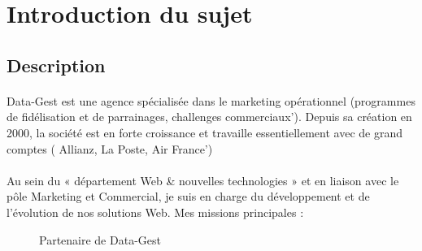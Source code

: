 \section{Introduction du sujet}
\justifying
\subsection{Description}
\paragraph{}
Data-Gest est une agence spécialisée dans le marketing opérationnel (programmes de fidélisation et de parrainages, challenges commerciaux'). Depuis sa création en 2000, la société est en forte croissance et travaille essentiellement avec de grand comptes ( Allianz, La Poste, Air France')
\paragraph{}


Au sein du « département Web \& nouvelles technologies » et en liaison avec le pôle Marketing et Commercial, je suis en charge du développement et de l'évolution de nos solutions Web. 
Mes missions principales :
\begin{figure}
  \centering
  \caption{Partenaire de Data-Gest}
  \label{fig:Partenaire de Data-Gest}
\end{figure}

